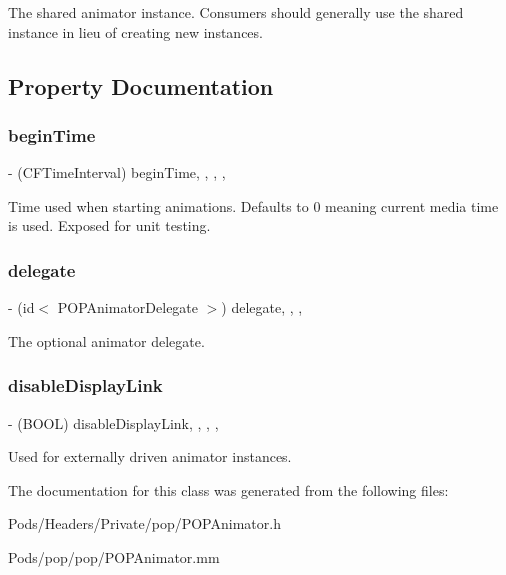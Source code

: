 The shared animator instance.  Consumers should generally use the shared instance in lieu of creating new instances. 

\subsection{Property Documentation}
\mbox{\label{interface_p_o_p_animator_a620436f3a1bc9c76d892752957a32d92}} 
\subsubsection{\texorpdfstring{begin\+Time}{beginTime}}
{\footnotesize\ttfamily -\/ (C\+F\+Time\+Interval) begin\+Time\hspace{0.3cm}{\ttfamily [read]}, {\ttfamily [write]}, {\ttfamily [nonatomic]}, {\ttfamily [assign]}, {\ttfamily [implementation]}}

Time used when starting animations. Defaults to 0 meaning current media time is used. Exposed for unit testing. \mbox{\label{interface_p_o_p_animator_a29a038d778233cb9210268457e890751}} 
\subsubsection{\texorpdfstring{delegate}{delegate}}
{\footnotesize\ttfamily -\/ (id$<$ P\+O\+P\+Animator\+Delegate $>$) delegate\hspace{0.3cm}{\ttfamily [read]}, {\ttfamily [write]}, {\ttfamily [nonatomic]}, {\ttfamily [weak]}}

The optional animator delegate. \mbox{\label{interface_p_o_p_animator_aba292fa27ed32f9b63f102f5b5789c4c}} 
\subsubsection{\texorpdfstring{disable\+Display\+Link}{disableDisplayLink}}
{\footnotesize\ttfamily -\/ (B\+O\+OL) disable\+Display\+Link\hspace{0.3cm}{\ttfamily [read]}, {\ttfamily [write]}, {\ttfamily [nonatomic]}, {\ttfamily [assign]}, {\ttfamily [implementation]}}

Used for externally driven animator instances. 

The documentation for this class was generated from the following files\+:\begin{DoxyCompactItemize}
\item 
Pods/\+Headers/\+Private/pop/P\+O\+P\+Animator.\+h\item 
Pods/pop/pop/P\+O\+P\+Animator.\+mm\end{DoxyCompactItemize}
